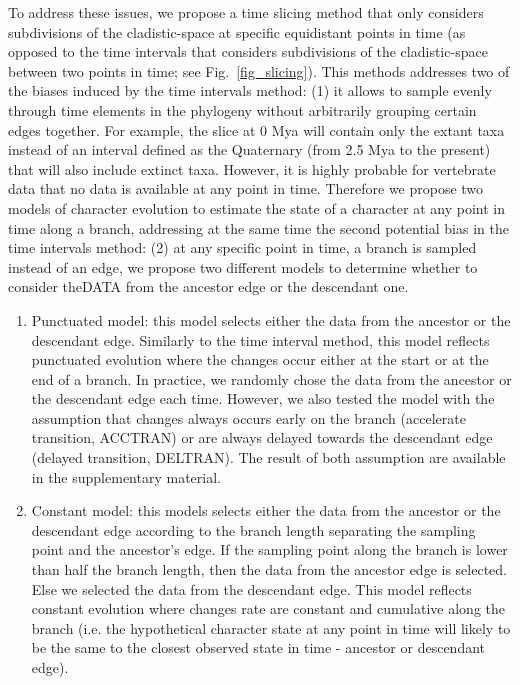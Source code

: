 \documentclass[12pt,letterpaper]{article}
\begin{document}
To address these issues, we propose a time slicing method that only considers subdivisions of the cladistic-space at specific equidistant points in time (as opposed to the time intervals that considers  subdivisions of the cladistic-space between two points in time; see Fig.~\ref{fig_slicing}). This methods addresses two of the biases induced by the time intervals method: (1) it allows to sample evenly through time elements in the phylogeny without arbitrarily grouping certain edges together. For example, the slice at 0 Mya will contain only the extant taxa instead of an interval defined as the Quaternary (from 2.5 Mya to the present) that will also include extinct taxa. However, it is highly probable for vertebrate data that no data is available at any point in time. Therefore we propose two models of character evolution to estimate the state of a character at any point in time along a branch, addressing at the same time the second potential bias in the time intervals method: (2) at any specific point in time, a branch is sampled instead of an edge, we propose two different models to determine whether to consider theDATA from the ancestor edge or the descendant one.
\begin{enumerate}
\item{Punctuated model:} this model selects either the data from the ancestor or the descendant edge. Similarly to the time interval method, this model reflects punctuated evolution where the changes occur either at the start or at the end of a branch. In practice, we randomly chose the data from the ancestor or the descendant edge each time. However, we also tested the model with the assumption that changes always occurs early on the branch (accelerate transition, ACCTRAN) or are always delayed towards the descendant edge (delayed transition, DELTRAN). The result of both assumption are available in the supplementary material.
\item{Constant model:} this models selects either the data from the ancestor or the descendant edge according to the branch length separating the sampling point and the ancestor's edge. If the sampling point along the branch is lower than half the branch length, then the data from the ancestor edge is selected. Else we selected the data from the descendant edge. This model reflects constant evolution where changes rate are constant and cumulative along the branch (i.e. the hypothetical character state at any point in time will likely to be the same to the closest observed state in time - ancestor or descendant edge).
\end{enumerate}
\end{document}

